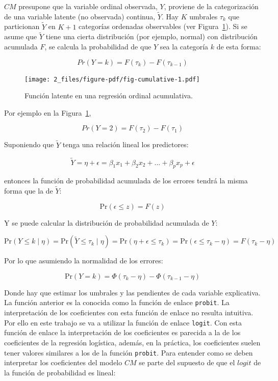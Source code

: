 \documentclass[
  12pt,
  a4paper,
  extrafontsizes,
  onecolumn,
  openright,
  table]{memoir}
\begin{document}
\(CM\) presupone que la variable ordinal observada, \(Y\), proviene de
la categorización de una variable latente (no observada) continua,
\(\tilde{Y}\). Hay \(K\) umbrales \(\tau_k\) que particionan
\(\tilde{Y}\) en \(K + 1\) categorías ordenadas observables (ver
Figura~\ref{fig-cumulative}). Si se asume que \(\tilde{Y}\) tiene una
cierta distribución (por ejemplo, normal) con distribución acumulada
\(F\), se calcula la probabilidad de que \(Y\) sea la categoría \(k\) de
esta forma:

\[Pr(Y = k) = F(\tau_k) - F(\tau_{k-1})\]

\begin{figure}[h]

{\centering \texttt{[image: 2\_files/figure-pdf/fig-cumulative-1.pdf]}

}

\caption{\label{fig-cumulative}Función latente en una regresión ordinal
acumulativa.}

\end{figure}

Por ejemplo en la Figura~\ref{fig-cumulative},

\[Pr(Y = 2) = F(\tau_2) - F(\tau_{1})\]

Suponiendo que \(\tilde{Y}\) tenga una relación lineal los predictores:

\[\tilde{Y} = \eta + \epsilon = \beta_1 x_1 + \beta_2 x_2 + ... + \beta_p x_p + \epsilon\]

entonces la función de probabilidad acumulada de los errores tendrá la
misma forma que la de \(\tilde{Y}\):

\[\mathrm{Pr}(\epsilon \leq z) = F(z)\]

Y se puede calcular la distribución de probabilidad acumulada de \(Y\):

\[\mathrm{Pr}(Y \leq k \mid \eta) = \mathrm{Pr}(\tilde{Y} \leq \tau_k \mid \eta) = \mathrm{Pr}(\eta + \epsilon \leq \tau_k) = \mathrm{Pr}(\epsilon \leq \tau_k - \eta) = F(\tau_k - \eta)\]

Por lo que asumiendo la normalidad de los errores:

\[\mathrm{Pr}(Y = k) = \Phi(\tau_k - \eta) - \Phi(\tau_{k - 1} - \eta)\]

Donde hay que estimar los umbrales y las pendientes de cada variable
explicativa. La función anterior es la conocida como la función de
enlace \texttt{probit}. La interpretación de los coeficientes con esta
función de enlace no resulta intuitiva. Por ello en este trabajo se va a
utilizar la función de enlace \texttt{logit}. Con esta función de enlace
la interpretación de los coeficientes es parecida a la de los
coeficientes de la regresión logística, además, en la práctica, los
coeficientes suelen tener valores similares a los de la función
\texttt{probit}. Para entender como se deben interpretar los
coeficientes del modelo \(CM\) se parte del supuesto de que el \(logit\)
de la función de probabilidad es lineal:
\end{document}
